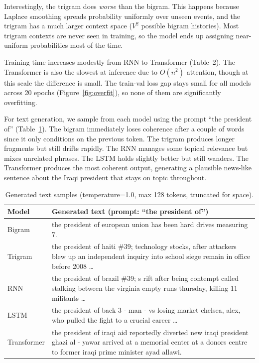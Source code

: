 \documentclass[11pt,a4paper]{article}
\begin{document}
Interestingly, the trigram does \emph{worse} than the bigram. This happens because Laplace smoothing spreads probability uniformly over unseen events, and the trigram has a much larger context space ($V^2$ possible bigram histories). Most trigram contexts are never seen in training, so the model ends up assigning near-uniform probabilities most of the time.

Training time increases modestly from RNN to Transformer (Table~2). The Transformer is also the slowest at inference due to $O(n^2)$ attention, though at this scale the difference is small. The train-val loss gap stays small for all models across 20 epochs (Figure~\ref{fig:overfit}), so none of them are significantly overfitting.

For text generation, we sample from each model using the prompt ``the president of'' (Table~\ref{tab:gen}). The bigram immediately loses coherence after a couple of words since it only conditions on the previous token. The trigram produces longer fragments but still drifts rapidly. The RNN manages some topical relevance but mixes unrelated phrases. The LSTM holds slightly better but still wanders. The Transformer produces the most coherent output, generating a plausible news-like sentence about the Iraqi president that stays on topic throughout.

\begin{table}[H]
\centering\small
\renewcommand{\arraystretch}{1.4}
\begin{tabular}{lp{11cm}}
\toprule
\textbf{Model} & \textbf{Generated text (prompt: ``the president of'')} \\
\midrule
Bigram & the president of european union has been hard drives measuring 7. \\
\hline
Trigram & the president of haiti \#39; technology stocks, after attackers blew up an independent inquiry into school siege remain in office before 2008 \ldots \\
\hline
RNN & the president of brazil \#39; s rift after being contempt called stalking between the virginia empty runs thursday, killing 11 militants \ldots \\
\hline
LSTM & the president of back 3 - man - vs losing market chelsea, alex, who pulled the fight to a crucial career \ldots \\
\hline
Transformer & the president of iraqi aid reportedly diverted new iraqi president ghazi al - yawar arrived at a memorial center at a donors centre to former iraqi prime minister ayad allawi. \\
\bottomrule
\end{tabular}
\renewcommand{\arraystretch}{1.0}
\caption{Generated text samples (temperature=1.0, max 128 tokens, truncated for space).}
\label{tab:gen}
\end{table}
\end{document}
